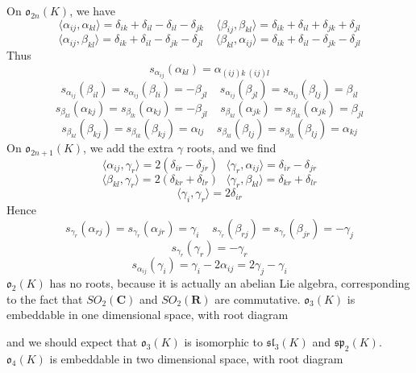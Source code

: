 \begin{example}
    On $\mathfrak{o}_{2n}(K)$, we have
    \[ \langle \alpha_{ij}, \alpha_{kl} \rangle = \delta_{ik} + \delta_{il} - \delta_{il} - \delta_{jk}\ \ \ \ \ \langle \beta_{ij}, \beta_{kl} \rangle = \delta_{ik} + \delta_{il} + \delta_{jk} + \delta_{jl} \]
    \[ \langle \alpha_{ij}, \beta_{kl} \rangle = \delta_{ik} + \delta_{il} - \delta_{jk} - \delta_{jl}\ \ \ \ \ \langle \beta_{kl}, \alpha_{ij} \rangle = \delta_{ik} + \delta_{il} - \delta_{jk} - \delta_{jl} \]
    Thus
    \[s_{\alpha_{ij}}(\alpha_{kl}) = \alpha_{(ij)k\ (ij)l} \]
    \[ s_{\alpha_{ij}}(\beta_{il}) = s_{\alpha_{ij}}(\beta_{li}) = - \beta_{jl}\ \ \ \ \ s_{\alpha_{ij}}(\beta_{jl}) = s_{\alpha_{ij}}(\beta_{lj}) = \beta_{il} \]
    \[ s_{\beta_{kl}}(\alpha_{kj}) = s_{\beta_{lk}}(\alpha_{kj}) = - \beta_{jl}\ \ \ \ \ s_{\beta_{kl}}(\alpha_{jk}) = s_{\beta_{lk}}(\alpha_{jk}) = \beta_{jl} \]
    \[ s_{\beta_{kl}}(\beta_{kj}) = s_{\beta_{lk}}(\beta_{kj}) = \alpha_{lj}\ \ \ \ \ s_{\beta_{kl}}(\beta_{lj}) = s_{\beta_{lk}}(\beta_{lj}) = \alpha_{kj} \]
    On $\mathfrak{o}_{2n+1}(K)$, we add the extra $\gamma$ roots, and we find
    \[ \langle \alpha_{ij}, \gamma_r \rangle = 2(\delta_{ir} - \delta_{jr})\ \ \ \langle \gamma_r, \alpha_{ij} \rangle = \delta_{ir} - \delta_{jr} \]
    \[ \langle \beta_{kl}, \gamma_r \rangle = 2(\delta_{kr} + \delta_{lr})\ \ \ \langle \gamma_r, \beta_{kl} \rangle = \delta_{kr} + \delta_{lr} \]
    \[ \langle \gamma_i, \gamma_r \rangle = 2\delta_{ir} \]
    Hence
    \[ s_{\gamma_r}(\alpha_{rj}) = s_{\gamma_r}(\alpha_{jr}) = \gamma_i\ \ \ \ \ s_{\gamma_r}(\beta_{rj}) = s_{\gamma_r}(\beta_{jr}) = - \gamma_j \]
    \[ s_{\gamma_r}(\gamma_r) = -\gamma_r \]
    \[ s_{\alpha_{ij}}(\gamma_i) = \gamma_i - 2\alpha_{ij} = 2\gamma_j - \gamma_i \]
    $\mathfrak{o}_2(K)$ has no roots, because it is actually an abelian Lie algebra, corresponding to the fact that $SO_2(\mathbf{C})$ and $SO_2(\mathbf{R})$ are commutative. $\mathfrak{o}_3(K)$ is embeddable in one dimensional space, with root diagram
    \begin{center}
    \end{center}
    and we should expect that $\mathfrak{o}_3(K)$ is isomorphic to $\mathfrak{sl}_3(K)$ and $\mathfrak{sp}_2(K)$. $\mathfrak{o}_4(K)$ is embeddable in two dimensional space, with root diagram
    \begin{center}
\end{center}
\end{example}
